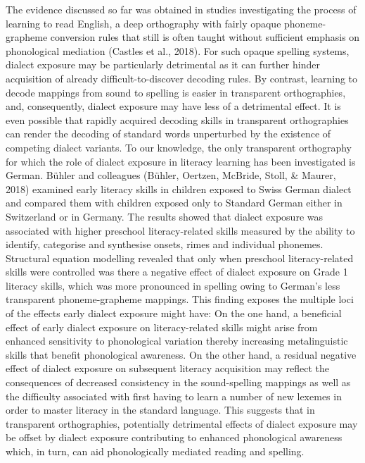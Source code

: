 \documentclass[doc,floatsintext]{apa6}
\begin{document}
The evidence discussed so far was obtained in studies investigating the
process of learning to read English, a deep orthography with fairly
opaque phoneme-grapheme conversion rules that still is often taught
without sufficient emphasis on phonological mediation (Castles et al.,
2018). For such opaque spelling systems, dialect exposure may be
particularly detrimental as it can further hinder acquisition of already
difficult-to-discover decoding rules. By contrast, learning to decode
mappings from sound to spelling is easier in transparent orthographies,
and, consequently, dialect exposure may have less of a detrimental
effect. It is even possible that rapidly acquired decoding skills in
transparent orthographies can render the decoding of standard words
unperturbed by the existence of competing dialect variants. To our
knowledge, the only transparent orthography for which the role of
dialect exposure in literacy learning has been investigated is German.
Bühler and colleagues (Bühler, Oertzen, McBride, Stoll, \& Maurer, 2018)
examined early literacy skills in children exposed to Swiss German
dialect and compared them with children exposed only to Standard German
either in Switzerland or in Germany. The results showed that dialect
exposure was associated with higher preschool literacy-related skills
measured by the ability to identify, categorise and synthesise onsets,
rimes and individual phonemes. Structural equation modelling revealed
that only when preschool literacy-related skills were controlled was
there a negative effect of dialect exposure on Grade 1 literacy skills,
which was more pronounced in spelling owing to German's less transparent
phoneme-grapheme mappings. This finding exposes the multiple loci of the
effects early dialect exposure might have: On the one hand, a beneficial
effect of early dialect exposure on literacy-related skills might arise
from enhanced sensitivity to phonological variation thereby increasing
metalinguistic skills that benefit phonological awareness. On the other
hand, a residual negative effect of dialect exposure on subsequent
literacy acquisition may reflect the consequences of decreased
consistency in the sound-spelling mappings as well as the difficulty
associated with first having to learn a number of new lexemes in order
to master literacy in the standard language. This suggests that in
transparent orthographies, potentially detrimental effects of dialect
exposure may be offset by dialect exposure contributing to enhanced
phonological awareness which, in turn, can aid phonologically mediated
reading and spelling.
\end{document}
